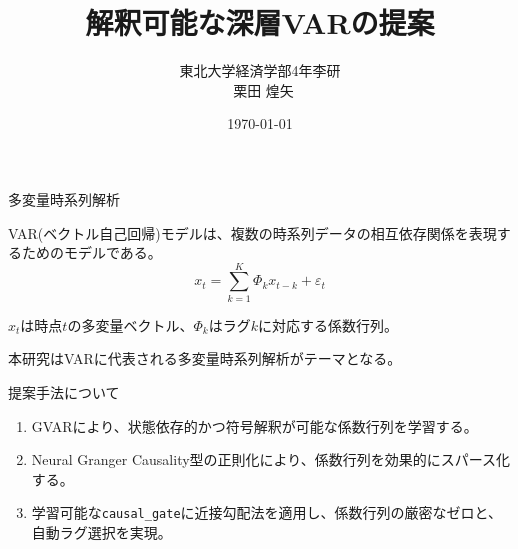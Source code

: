 \documentclass[dvipdfmx,11pt]{beamer}
\title{解釈可能な深層VARの提案}
\author[栗田 煌矢]{
  東北大学経済学部4年李研\texorpdfstring{\\}{ }\
  栗田 煌矢}
\date{\today}
\begin{document}
\begin{frame}
  \titlepage
\end{frame}


\begin{frame}{多変量時系列解析}

 

VAR(ベクトル自己回帰)モデルは、複数の時系列データの相互依存関係を表現するためのモデルである。
  \[
    x_t
    =
    \sum_{k=1}^{K}
    \Phi_k x_{t-k}
    +
    \varepsilon_t
  \]

$x_t$は時点$t$の多変量ベクトル、$\Phi_k$はラグ$k$に対応する係数行列。
  
本研究はVARに代表される多変量時系列解析がテーマとなる。

\end{frame}



\begin{frame}{提案手法について}

  \begin{enumerate}
    \item GVARにより、状態依存的かつ符号解釈が可能な係数行列を学習する。
    \item Neural Granger Causality型の正則化により、係数行列を効果的にスパース化する。
    \item 学習可能な\texttt{causal\_gate}に近接勾配法を適用し、係数行列の厳密なゼロと、自動ラグ選択を実現。
  \end{enumerate}
\end{frame}
\end{document}

